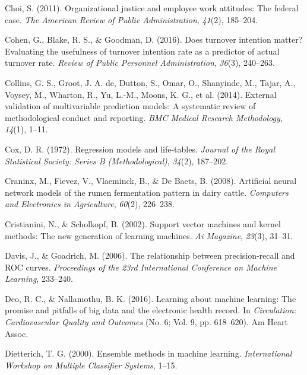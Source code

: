 \documentclass[
  man]{apa7}
\newlength{\cslhangindent}
\newlength{\cslentryspacingunit} %
\newenvironment{CSLReferences}[2] %
 {%
  \setlength{\parindent}{0pt}
  \ifodd #1
  \let\oldpar\par
  \def\par{\hangindent=\cslhangindent\oldpar}
  \fi
  \setlength{\parskip}{#2\cslentryspacingunit}
 }%
 {}
\begin{document}
\begin{CSLReferences}{1}{0}
\leavevmode{}%
Choi, S. (2011). Organizational justice and employee work attitudes: The federal case. \emph{The American Review of Public Administration}, \emph{41}(2), 185--204.

\leavevmode{}%
Cohen, G., Blake, R. S., \& Goodman, D. (2016). Does turnover intention matter? Evaluating the usefulness of turnover intention rate as a predictor of actual turnover rate. \emph{Review of Public Personnel Administration}, \emph{36}(3), 240--263.

\leavevmode{}%
Collins, G. S., Groot, J. A. de, Dutton, S., Omar, O., Shanyinde, M., Tajar, A., Voysey, M., Wharton, R., Yu, L.-M., Moons, K. G., et al. (2014). External validation of multivariable prediction models: A systematic review of methodological conduct and reporting. \emph{BMC Medical Research Methodology}, \emph{14}(1), 1--11.

\leavevmode{}%
Cox, D. R. (1972). Regression models and life-tables. \emph{Journal of the Royal Statistical Society: Series B (Methodological)}, \emph{34}(2), 187--202.

\leavevmode{}%
Craninx, M., Fievez, V., Vlaeminck, B., \& De Baets, B. (2008). Artificial neural network models of the rumen fermentation pattern in dairy cattle. \emph{Computers and Electronics in Agriculture}, \emph{60}(2), 226--238.

\leavevmode{}%
Cristianini, N., \& Scholkopf, B. (2002). Support vector machines and kernel methods: The new generation of learning machines. \emph{Ai Magazine}, \emph{23}(3), 31--31.

\leavevmode{}%
Davis, J., \& Goadrich, M. (2006). The relationship between precision-recall and ROC curves. \emph{Proceedings of the 23rd International Conference on Machine Learning}, 233--240.

\leavevmode{}%
Deo, R. C., \& Nallamothu, B. K. (2016). Learning about machine learning: The promise and pitfalls of big data and the electronic health record. In \emph{Circulation: Cardiovascular Quality and Outcomes} (No. 6; Vol. 9, pp. 618--620). Am Heart Assoc.

\leavevmode{}%
Dietterich, T. G. (2000). Ensemble methods in machine learning. \emph{International Workshop on Multiple Classifier Systems}, 1--15.


\end{CSLReferences}
\end{document}

